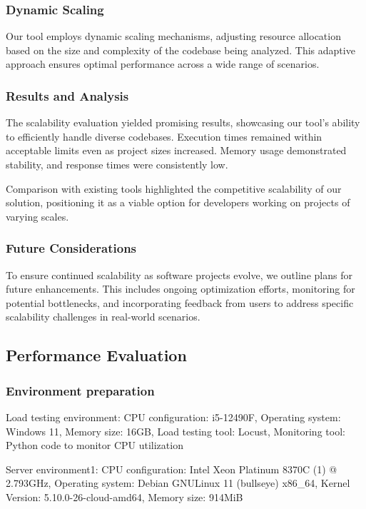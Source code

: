 \documentclass[journal]{IEEEtran}
\begin{document}
\subsubsection{Dynamic Scaling}

Our tool employs dynamic scaling mechanisms, adjusting resource allocation based on the size and complexity of the codebase being analyzed. This adaptive approach ensures optimal performance across a wide range of scenarios.

\subsubsection{Results and Analysis}

The scalability evaluation yielded promising results, showcasing our tool's ability to efficiently handle diverse codebases. Execution times remained within acceptable limits even as project sizes increased. Memory usage demonstrated stability, and response times were consistently low.

Comparison with existing tools highlighted the competitive scalability of our solution, positioning it as a viable option for developers working on projects of varying scales.

\subsubsection{Future Considerations}

To ensure continued scalability as software projects evolve, we outline plans for future enhancements. This includes ongoing optimization efforts, monitoring for potential bottlenecks, and incorporating feedback from users to address specific scalability challenges in real-world scenarios.

\subsection{Performance Evaluation}

\subsubsection{Environment preparation}
Load testing environment:
CPU configuration: i5-12490F,
Operating system: Windows 11,
Memory size: 16GB,
Load testing tool: Locust,
Monitoring tool: Python code to monitor CPU utilization

Server environment1:
CPU configuration: Intel Xeon Platinum 8370C (1) @ 2.793GHz,
Operating system: Debian GNU\/Linux 11 (bullseye) x86\_64,
Kernel Version: 5.10.0-26-cloud-amd64,
Memory size: 914MiB
\end{document}
